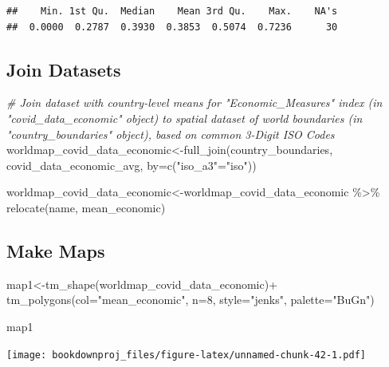 \documentclass[
]{article}
\newenvironment{Shaded}{\begin{snugshade}}{\end{snugshade}}
\newcommand{\AttributeTok}[1]{\textcolor[rgb]{0.77,0.63,0.00}{#1}}
\newcommand{\CommentTok}[1]{\textcolor[rgb]{0.56,0.35,0.01}{\textit{#1}}}
\newcommand{\DecValTok}[1]{\textcolor[rgb]{0.00,0.00,0.81}{#1}}
\newcommand{\FunctionTok}[1]{\textcolor[rgb]{0.00,0.00,0.00}{#1}}
\newcommand{\NormalTok}[1]{#1}
\newcommand{\OtherTok}[1]{\textcolor[rgb]{0.56,0.35,0.01}{#1}}
\newcommand{\SpecialCharTok}[1]{\textcolor[rgb]{0.00,0.00,0.00}{#1}}
\newcommand{\StringTok}[1]{\textcolor[rgb]{0.31,0.60,0.02}{#1}}
\begin{document}
\begin{Shaded}
\end{Shaded}

\begin{verbatim}
##    Min. 1st Qu.  Median    Mean 3rd Qu.    Max.    NA's 
##  0.0000  0.2787  0.3930  0.3853  0.5074  0.7236      30
\end{verbatim}

\hypertarget{join-datasets}{%
\subsection{Join Datasets}\label{join-datasets}}

\begin{Shaded}
\begin{Highlighting}[]
\CommentTok{\# Join dataset with country{-}level means for "Economic\_Measures" index (in "covid\_data\_economic" object) to spatial dataset of world boundaries (in "country\_boundaries" object), based on common 3{-}Digit ISO Codes}
\NormalTok{worldmap\_covid\_data\_economic}\OtherTok{\textless{}{-}}\FunctionTok{full\_join}\NormalTok{(country\_boundaries, covid\_data\_economic\_avg, }\AttributeTok{by=}\FunctionTok{c}\NormalTok{(}\StringTok{"iso\_a3"}\OtherTok{=}\StringTok{"iso"}\NormalTok{))}
\end{Highlighting}
\end{Shaded}

\begin{Shaded}
\begin{Highlighting}[]
\NormalTok{worldmap\_covid\_data\_economic}\OtherTok{\textless{}{-}}\NormalTok{worldmap\_covid\_data\_economic }\SpecialCharTok{\%\textgreater{}\%} \FunctionTok{relocate}\NormalTok{(name, mean\_economic)}
\end{Highlighting}
\end{Shaded}

\hypertarget{make-maps}{%
\subsection{Make Maps}\label{make-maps}}

\begin{Shaded}
\begin{Highlighting}[]
\NormalTok{map1}\OtherTok{\textless{}{-}}\FunctionTok{tm\_shape}\NormalTok{(worldmap\_covid\_data\_economic)}\SpecialCharTok{+}
        \FunctionTok{tm\_polygons}\NormalTok{(}\AttributeTok{col=}\StringTok{"mean\_economic"}\NormalTok{, }\AttributeTok{n=}\DecValTok{8}\NormalTok{, }\AttributeTok{style=}\StringTok{"jenks"}\NormalTok{, }\AttributeTok{palette=}\StringTok{"BuGn"}\NormalTok{)}
\end{Highlighting}
\end{Shaded}

\begin{Shaded}
\begin{Highlighting}[]
\NormalTok{map1}
\end{Highlighting}
\end{Shaded}

\texttt{[image: bookdownproj\_files/figure-latex/unnamed-chunk-42-1.pdf]}
\end{document}
